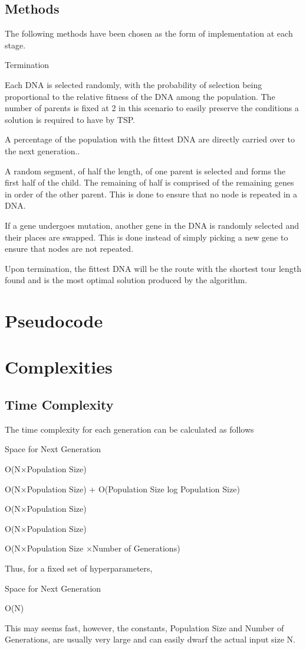 \documentclass[sigconf]{acmart}
\begin{document}
\subsection{Methods}
The following methods have been chosen as the form of implementation at each stage.
\begin{labeling}{Termination\quad}
  \item[Selection] Each DNA is selected randomly, with the probability of selection being proportional to the relative fitness of the DNA among the population. The number of parents is fixed at 2 in this scenario to easily preserve the conditions a solution is required to have by TSP. 
  \item[Elitism] A percentage of the population with the fittest DNA are directly carried over to the next generation..
  \item[Crossover] A random segment, of half the length, of one parent is selected and forms the first half of the child. The remaining of half is comprised of the remaining genes in order of the other parent. This is done to ensure that no node is repeated in a DNA.
  \item[Mutation] If a gene undergoes mutation, another gene in the DNA is randomly selected and their places are swapped. This is done instead of simply picking a new gene to ensure that nodes are not repeated.
  \item[Termination] Upon termination, the fittest DNA will be the route with the shortest tour length found and is the most optimal solution produced by the algorithm.
\end{labeling}

\section{Pseudocode}
\section{Complexities}
\subsection{Time Complexity}
The time complexity for each generation can be calculated as follows
\begin{labeling}{Space for Next Generation\quad}
  \item[Initialization] O(N×Population Size)
  \item[Selection] O(N×Population Size)
  + O(Population Size log Population Size)
  \item[Mating] O(N×Population Size)
  \item[Mutation] O(N×Population Size)
  \item[Total Time Complexity] O(N×Population Size
  ×Number of Generations)
\end{labeling}
Thus, for a fixed set of hyperparameters,
\begin{labeling}{Space for Next Generation\quad}
  \item[Total Time Complexity] O(N)
\end{labeling}
This may seems fast, however, the constants, Population Size and Number of Generations, are usually very large and can easily dwarf the actual input size N. 
\end{document}
